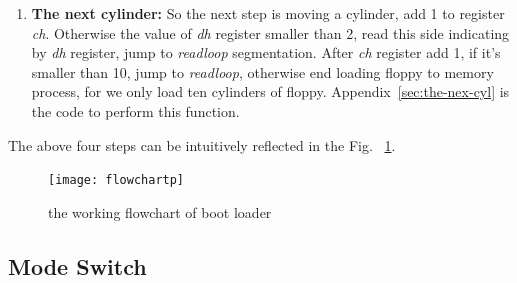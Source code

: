 \documentclass{swfcthesis}
\begin{document}
\begin{enumerate}
  
  
\item \textbf{The next cylinder:} So the next step is moving a cylinder, add 1 to register
  \emph{ch}. Otherwise the value of \emph{dh} register smaller than 2, read this side
  indicating by \emph{dh} register, jump to \emph{readloop} segmentation. After
  \emph{ch} register add 1, if it's smaller than 10, jump to \emph{readloop},
  otherwise end loading floppy to memory process, for we only load ten cylinders of
  floppy. Appendix~\ref{sec:the-nex-cyl} is the code to perform this function.
\end{enumerate}

The above four steps can be intuitively reflected in the Fig. ~\ref{fig:iplflowchart}.
\begin{figure}[!htbp]
  \centering
  \texttt{[image: flowchartp]}
  \caption{the working flowchart of boot loader}
  \label{fig:iplflowchart}
\end{figure}

\subsection{Mode Switch}
\label{sec:mode-switch}
\end{document}
